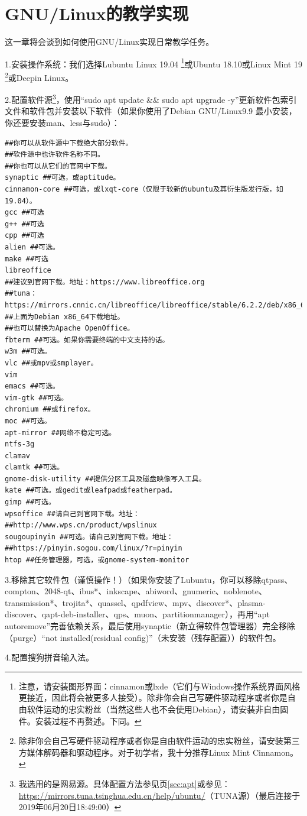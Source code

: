 \documentclass{book}
\begin{document}
\section{GNU/Linux的教学实现}
这一章将会谈到如何使用GNU/Linux实现日常教学任务。\par
1.安装操作系统：我们选择Lubuntu Linux 19.04 \footnote{注意，请安装图形界面：cinnamon或lxde（它们与Windows操作系统界面风格更接近，因此将会被更多人接受）。除非你会自己写硬件驱动程序或者你是自由软件运动的忠实粉丝（当然这些人也不会使用Debian），请安装非自由固件。安装过程不再赘述。下同。}或Ubuntu 18.10或Linux Mint 19 \footnote{除非你会自己写硬件驱动程序或者你是自由软件运动的忠实粉丝，请安装第三方媒体解码器和驱动程序。对于初学者，我十分推荐Linux Mint Cinnamon。}或Deepin Linux。 \par
2.配置软件源\footnote{我选用的是网易源。具体配置方法参见\pageref{sec:apt}页\ref{sec:apt}或参见：\url{https://mirrors.tuna.tsinghua.edu.cn/help/ubuntu/}（TUNA源）（最后连接于2019年06月20日18:49:00）}，使用“sudo apt update \&\& sudo apt upgrade -y”更新软件包索引文件和软件包并安装以下软件（如果你使用了Debian GNU/Linux9.9 最小安装，你还要安装man、less与sudo）：
\begin{verbatim}
##你可以从软件源中下载绝大部分软件。
##软件源中也许软件名称不同。
##你也可以从它们的官网中下载。
synaptic ##可选，或aptitude。
cinnamon-core ##可选，或lxqt-core（仅限于较新的ubuntu及其衍生版发行版，如19.04）。
gcc ##可选
g++ ##可选
cpp ##可选
alien ##可选。
make ##可选
libreoffice
##建议到官网下载。地址：https://www.libreoffice.org
##tuna：https://mirrors.cnnic.cn/libreoffice/libreoffice/stable/6.2.2/deb/x86_64/
##上面为Debian x86_64下载地址。
##也可以替换为Apache OpenOffice。
fbterm ##可选。如果你需要终端的中文支持的话。
w3m ##可选。
vlc ##或mpv或smplayer。
vim
emacs ##可选。
vim-gtk ##可选。
chromium ##或firefox。
moc ##可选。
apt-mirror ##网络不稳定可选。
ntfs-3g
clamav
clamtk ##可选。
gnome-disk-utility ##提供分区工具及磁盘映像写入工具。
kate ##可选。或gedit或leafpad或featherpad。
gimp ##可选。
wpsoffice ##请自己到官网下载。地址：
##http://www.wps.cn/product/wpslinux
sougoupinyin ##可选。请自己到官网下载。地址：
##https://pinyin.sogou.com/linux/?r=pinyin
htop ##任务管理器，可选，或gnome-system-monitor
\end{verbatim}
3.移除其它软件包（谨慎操作！）（如果你安装了Lubuntu，你可以移除qtpass、compton、2048-qt、ibus*、inkscape、abiword、gnumeric、noblenote、transmission*、trojita*、quassel、qpdfview、mpv、discover*、plasma-discover、qapt-deb-installer、qps、muon、partitionmanager），再用“apt autoremove”完善依赖关系，最后使用synaptic（新立得软件包管理器）完全移除（purge）“not installed(residual config)”（未安装（残存配置））的软件包。\par
4.配置搜狗拼音输入法。
\end{document}

